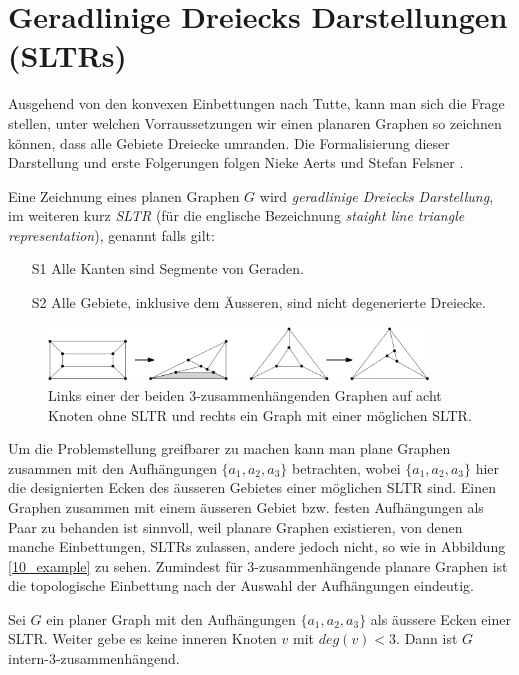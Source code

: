 \section{Geradlinige Dreiecks Darstellungen (SLTRs)}

Ausgehend von den konvexen Einbettungen nach Tutte, kann man sich die Frage stellen, unter welchen Vorraussetzungen wir einen planaren Graphen so zeichnen können, dass alle Gebiete Dreiecke umranden. Die Formalisierung dieser Darstellung und erste Folgerungen folgen Nieke Aerts und Stefan Felsner \cite{af13,af15}.

\begin{definition}[SLTR]\label{defsltr}
Eine Zeichnung eines planen Graphen $G$ wird \textit{geradlinige Dreiecks Darstellung}, im weiteren kurz \textit{SLTR} (für die englische Bezeichnung \textit{staight line triangle representation}), genannt falls gilt:
\begin{itemize}
\item[S1] Alle Kanten sind Segmente von Geraden.
\item[S2] Alle Gebiete, inklusive dem Äusseren, sind nicht degenerierte Dreiecke.
\end{itemize}
\end{definition}

\begin{figure}[h]
	\centering
  \includegraphics[width=0.9\textwidth]{sltr-example.png}
	\caption{Links einer der beiden 3-zusammenhängenden Graphen auf acht Knoten ohne SLTR und rechts ein Graph mit einer möglichen SLTR.}
\end{figure}

Um die Problemstellung greifbarer zu machen kann man plane Graphen zusammen mit den Aufhängungen $\{a_1,a_2,a_3\}$ betrachten, wobei $\{a_1,a_2,a_3\}$ hier die designierten Ecken des äusseren Gebietes einer möglichen SLTR sind. Einen Graphen zusammen mit einem äusseren Gebiet bzw. festen Aufhängungen als Paar zu behanden ist sinnvoll, weil planare Graphen existieren, von denen manche Einbettungen, SLTRs zulassen, andere jedoch nicht, so wie in Abbildung \ref{10_example} zu sehen. Zumindest für 3-zusammenhängende planare Graphen ist die topologische Einbettung nach der Auswahl der Aufhängungen eindeutig.

\begin{proposition}\cite[Proposition 1.2]{af13}
Sei $G$ ein planer Graph mit den Aufhängungen $\{a_1,a_2,a_3\}$ als äussere Ecken einer SLTR. Weiter gebe es keine inneren Knoten $v$ mit $deg(v) < 3$. Dann ist $G$ intern-3-zusammenhängend.
\end{proposition}

